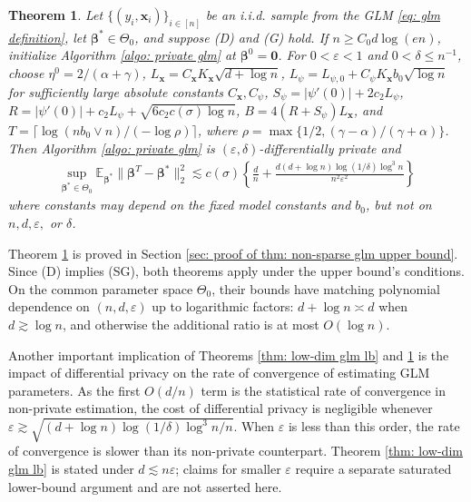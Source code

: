 \documentclass[letterpaper,12pt]{article}
\numberwithin{equation}{section}
\theoremstyle{plain}
\newtheorem{Theorem}{Theorem}
\numberwithin{Theorem}{section}
\numberwithin{proposition}{section}
\numberwithin{Lemma}{section}
{
	\theoremstyle{definition}
	\newtheorem{Definition}{Definition}
	\newtheorem{example}{Example}
	\numberwithin{example}{section}
	\newtheorem{fact}{Fact}
	\numberwithin{fact}{section}
	\newtheorem{remark}{Remark}
}
\newcommand{\rev}[1]{#1}
\newcommand{\1}{\mathbbm{1}}
\def\bbeta{{\boldsymbol{\beta}}}
\def\E{\mathbb{E}}
\begin{document}
\begin{Theorem}\label{thm: non-sparse glm upper bound}
		\rev{Let $\{(y_i, \bm x_i)\}_{i \in [n]}$ be an i.i.d. sample from the GLM \eqref{eq: glm definition}, let $\bbeta^*\in\Theta_0$, and suppose (D) and (G) hold. If $n\geq C_0d\log(en)$, initialize Algorithm \ref{algo: private glm} at $\bbeta^0=\bm0$. For $0<\varepsilon<1$ and $0<\delta\leq n^{-1}$, choose $\eta^0=2/(\alpha+\gamma)$, $L_{\bm x}=C_{\bm x}K_{\bm x}\sqrt{d+\log n}$, $L_\psi=L_{\psi,0}+C_\psi K_{\bm x}b_0\sqrt{\log n}$ for sufficiently large absolute constants $C_{\bm x},C_\psi$, $S_\psi=|\psi'(0)|+2c_2L_\psi$, $R=|\psi'(0)|+c_2L_\psi+\sqrt{6c_2c(\sigma)\log n}$, $B=4(R+S_\psi)L_{\bm x}$, and $T=\lceil\log(nb_0\vee n)/(-\log\rho)\rceil$, where $\rho=\max\{1/2,(\gamma-\alpha)/(\gamma+\alpha)\}$. Then Algorithm \ref{algo: private glm} is $(\varepsilon,\delta)$-differentially private and}
	\begin{align}
		\rev{\sup_{\bbeta^*\in\Theta_0}\E_{\bbeta^*}\|\bbeta^T - \bbeta^*\|^2_2 \lesssim c(\sigma)\left\{{\frac{d}{n}} + \frac{d(d+\log n) \log(1/\delta)\log^3 n}{n^2\varepsilon^2}\right\}} \label{eq: non-sparse glm upper bound}
	\end{align}
	\rev{where constants may depend on the fixed model constants and $b_0$, but not on $n,d,\varepsilon,$ or $\delta$.}
\end{Theorem}
Theorem \ref{thm: non-sparse glm upper bound} is proved in Section \ref{sec: proof of thm: non-sparse glm upper bound}. \rev{Since (D) implies (SG), both theorems apply under the upper bound's conditions. On the common parameter space $\Theta_0$, their bounds have matching polynomial dependence on $(n,d,\varepsilon)$ up to logarithmic factors: $d+\log n\asymp d$ when $d\gtrsim\log n$, and otherwise the additional ratio is at most $O(\log n)$.}

Another important implication of Theorems \ref{thm: low-dim glm lb} and \ref{thm: non-sparse glm upper bound} is the impact of differential privacy on the rate of convergence of estimating GLM parameters. As the first $O(d/n)$ term is the statistical rate of convergence in non-private estimation, the cost of differential privacy is negligible whenever $\varepsilon \gtrsim \rev{\sqrt{(d+\log n)\log(1/\delta)\log^3 n/n}}$. When $\varepsilon$ is less than this order, the rate of convergence is slower than its non-private \rev{counterpart}. \rev{Theorem \ref{thm: low-dim glm lb} is stated under $d\lesssim n\varepsilon$; claims for smaller $\varepsilon$ require a separate saturated lower-bound argument and are not asserted here.}
\end{document}
